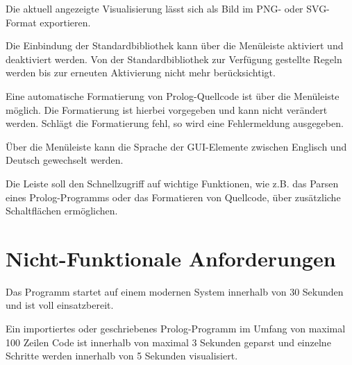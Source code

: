 \documentclass[parskip=full,11pt,twoside]{scrartcl}
\begin{document}

Die aktuell angezeigte Visualisierung lässt sich als Bild im PNG- oder SVG-Format exportieren.


Die Einbindung der Standardbibliothek kann über die Menüleiste aktiviert und deaktiviert werden. Von der Standardbibliothek zur Verfügung gestellte Regeln werden bis zur erneuten Aktivierung nicht mehr berücksichtigt.


Eine automatische Formatierung von Prolog-Quellcode ist über die Menüleiste möglich. Die Formatierung ist hierbei vorgegeben und kann nicht verändert werden. Schlägt die Formatierung fehl, so wird eine Fehlermeldung ausgegeben.


Über die Menüleiste kann die Sprache der GUI-Elemente zwischen Englisch und Deutsch gewechselt werden.


Die Leiste soll den Schnellzugriff auf wichtige Funktionen, wie z.B. das Parsen eines Prolog-Programms oder das Formatieren von Quellcode, über zusätzliche Schaltflächen ermöglichen.

\section{Nicht-Funktionale Anforderungen}


Das Programm startet auf einem modernen System innerhalb von 30 Sekunden und ist voll einsatzbereit.


Ein importiertes oder geschriebenes Prolog-Programm im Umfang von maximal 100 Zeilen Code ist innerhalb von maximal 3 Sekunden geparst und einzelne Schritte werden innerhalb von 5 Sekunden visualisiert.

\end{document}
